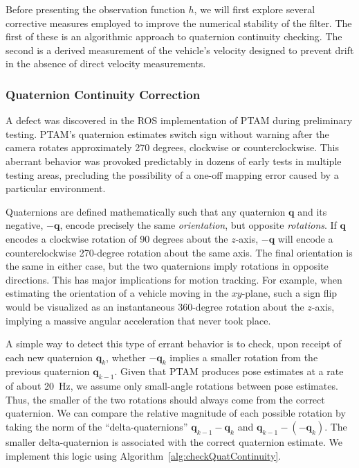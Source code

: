 Before presenting the observation function $h$, we will first explore several corrective measures employed to improve the numerical stability of the filter. The first of these is an algorithmic approach to quaternion continuity checking. The second is a derived measurement of the vehicle's velocity designed to prevent drift in the absence of direct velocity measurements.

\subsubsection{Quaternion Continuity Correction}

A defect was discovered in the ROS implementation of PTAM during preliminary testing. PTAM's quaternion estimates switch sign without warning after the camera rotates approximately 270 degrees, clockwise or counterclockwise. This aberrant behavior was provoked predictably in dozens of early tests in multiple testing areas, precluding the possibility of a one-off mapping error caused by a particular environment.

Quaternions are defined mathematically such that any quaternion $\mathbf{q}$ and its negative, $- \mathbf{q}$, encode precisely the same \textit{orientation}, but opposite \textit{rotations}. If $\mathbf{q}$ encodes a clockwise rotation of 90 degrees about the $z$-axis, $- \mathbf{q}$ will encode a counterclockwise 270-degree rotation about the same axis. The final orientation is the same in either case, but the two quaternions imply rotations in opposite directions. This has major implications for motion tracking. For example, when estimating the orientation of a vehicle moving in the $xy$-plane, such a sign flip would be visualized as an instantaneous 360-degree rotation about the $z$-axis, implying a massive angular acceleration that never took place. 

A simple way to detect this type of errant behavior is to check, upon receipt of each new quaternion $\mathbf{q}_{k}$, whether $- \mathbf{q}_{k}$ implies a smaller rotation from the previous quaternion $\mathbf{q}_{k-1}$. Given that PTAM produces pose estimates at a rate of about 20~Hz, we assume only small-angle rotations between pose estimates. Thus, the smaller of the two rotations should always come from the correct quaternion. We can compare the relative magnitude of each possible rotation by taking the norm of the ``delta-quaternions'' $\mathbf{q}_{k-1} - \mathbf{q}_{k}$ and $\mathbf{q}_{k-1} - \left( - \mathbf{q}_{k} \right)$. The smaller delta-quaternion is associated with the correct quaternion estimate. We implement this logic using Algorithm~\ref{alg:checkQuatContinuity}.

